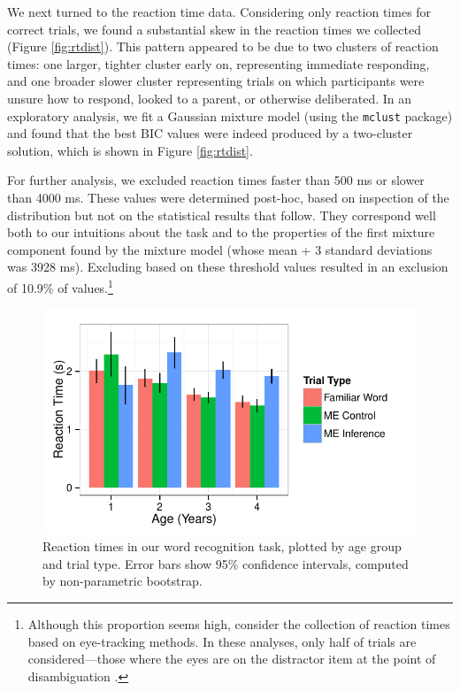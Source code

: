 \documentclass[man,noapacite]{apa2}
\begin{document}
We next turned to the reaction time data. Considering only reaction times for correct trials, we found a substantial skew in the reaction times we collected (Figure \ref{fig:rtdist}). This pattern appeared to be due to two clusters of reaction times: one larger, tighter cluster early on, representing immediate responding, and one broader slower cluster representing trials on which participants were unsure how to respond, looked to a parent, or otherwise deliberated. In an exploratory analysis, we fit a Gaussian mixture model (using the \texttt{mclust} package) and found that the best BIC values were indeed produced by a two-cluster solution, which is shown in Figure \ref{fig:rtdist}. 

For further analysis, we excluded reaction times faster than 500 ms or slower than 4000 ms. These values were determined post-hoc, based on inspection of the distribution but not on the statistical results that follow. They correspond well both to our intuitions about the task and to the properties of the first mixture component found by the mixture model (whose mean + 3 standard deviations was 3928 ms). Excluding based on these threshold values resulted in an exclusion of 10.9\% of values.\footnote{Although this proportion seems high, consider the collection of reaction times based on eye-tracking methods. In these analyses, only half of trials are considered---those where the eyes are on the distractor item at the point of disambiguation \cite{fernald2008}.}


\begin{figure}[t] 
  \begin{center} 
    \includegraphics[width=5in]{figures/rt.pdf} 
    \caption{\label{fig:rt} Reaction times in our word recognition task, plotted by age group and trial type. Error bars show 95\% confidence intervals, computed by non-parametric bootstrap.}
  \end{center} 
\end{figure}
\end{document}
